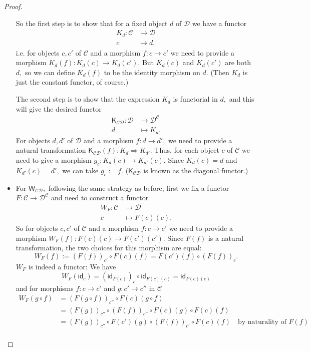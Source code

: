 \documentclass[a4paper]{article}
\theoremstyle{definition}
\theoremstyle{remark}
\newcommand{\C}{\mathcal{C}}
\newcommand{\D}{\mathcal{D}}
\newcommand{\nm}{\mathsf}
\newcommand{\id}{\nm{id}}
\newcommand{\combinator}{\nm}
\newcommand{\constFun}{\combinator{K}}
\newcommand{\dupFun}{\combinator{W}}
\begin{document}
\begin{proof}
\begin{itemize}
    So the first step is to show that for a fixed object $d$ of $\D$ we have a functor
    \begin{align*}
      K_d : \C &\to     \D\\
            c  &\mapsto d,
    \end{align*}
    i.e. for objects $c,c'$ of $\C$ and a morphism $f : c \to c'$ we need to
    provide a morphism $K_d(f) : K_d(c) \to K_d(c').$ But $K_d(c)$ and $K_d(c')$
    are both $d,$ so we can define $K_d(f)$ to be the identity morphism on $d.$ (Then
    $K_d$ is just the constant functor, of course.)

    The second step is to show that the expression $K_d$ is functorial in $d,$ and
    this will give the desired functor
    \begin{align*}
      \constFun_{\C\D} : \D &\to     \D^\C\\
                         d  &\mapsto K_d.
    \end{align*}
    For objects $d,d'$ of $\D$ and a morphism $f : d \to d',$ we need to provide a
    natural transformation $\constFun_{\C\D}(f) : K_d \Rightarrow K_{d'}.$
    Thus, for each object $c$ of $\C$ we need to give a morphism
    $g_c : K_d(c) \to K_{d'}(c).$ Since $K_d(c) = d$ and $K_{d'}(c) = d',$ we can
    take $g_c := f.$ ($\constFun_{\C\D}$ is known as the diagonal functor.)
    \item For $\dupFun_{\C\D},$ following the same strategy as before, first we fix a
    functor $F : \C \to \D^\C$ and need to construct a functor
    \begin{align*}
      W_F : \C &\to     \D\\
            c  &\mapsto F(c)(c).
    \end{align*}
    So for objects $c,c'$ of $\C$ and a morphism $f : c \to c'$ we need to provide
    a morphism $W_F(f) : F(c)(c) \to F(c')(c').$ Since $F(f)$ is a natural
    transformation, the two choices for this morphism are equal:
    \[W_F(f) := (F(f))_{c'} \circ F(c)(f) = F(c')(f) \circ (F(f))_c.\]
    $W_F$ is indeed a functor: We have
    \[W_F(\id_c) = (\id_{F(c)})_{c} \circ \id_{F(c)(c)} = \id_{F(c)(c)}\]
    and for morphisms $f : c \to c'$ and $g : c' \to c''$ in $\C$
    \begin{align*}
      W_F(g \circ f) &= (F(g \circ f))_{c''} \circ F(c)(g \circ f)\\
                     &= (F(g))_{c''} \circ (F(f))_{c''} \circ F(c)(g) \circ F(c)(f)\\
                     &= (F(g))_{c''} \circ F(c')(g) \circ (F(f))_{c'} \circ F(c)(f) \quad \text{by naturality of $F(f)$}\\

\end{align*}
\end{itemize}
\end{proof}
\end{document}
